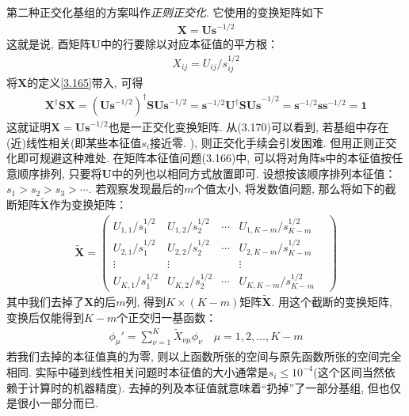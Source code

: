 第二种正交化基组的方案叫作\emph{正则正交化}. 
它使用的变换矩阵如下
\begin{align}
	\mathbf{X=Us}^{-1/2}
\end{align}
这就是说, 
酉矩阵$\mathbf{U}$中的行要除以对应本征值的平方根：
\begin{align}
	X_{ij} = U_{ij}/s_{ij}^{1/2}
\end{align}
将$\mathbf{X}$的定义\autoref{3.165}带入, 
可得
\begin{align}
	\mathbf{X^\dagger SX} = (\mathbf{Us}^{-1/2})^\dagger\mathbf{SUs}^{-1/2} = \mathbf{s}^{-1/2}\mathbf{U^\dagger SUs}^{-1/2} = \mathbf{s}^{-1/2}\mathbf{ss}^{-1/2}=\mathbf{1}
\end{align}
这就证明$\mathbf{X=Us}^{-1/2}$也是一正交化变换矩阵. 
从(3.170)可以看到, 
若基组中存在(近)线性相关(即某些本征值$s_i$接近零.
), 
则正交化手续会引发困难. 
但用正则正交化即可规避这种难处. 
在矩阵本征值问题(3.166)中, 
可以将对角阵$\mathbf{s}$中的本征值按任意顺序排列, 
只要将$\mathbf{U}$中的列也以相同方式放置即可. 
设想按该顺序排列本征值：$s_1>s_2>s_3>\cdots$. 
若观察发现最后的$m$个值太小, 
将发数值问题, 
那么将如下的截断矩阵$\mathbf{\tilde{X}}$作为变换矩阵：
\begin{align}
	\tilde{\mathbf{X}} =
	\begin{pmatrix}
		U_{1,1}/s^{1/2}_{1} & U_{1,2}/s^{1/2}_{2} & \cdots & U_{1,K-m}/s^{1/2}_{K-m} &  \\
		U_{2,1}/s^{1/2}_{1} & U_{2,2}/s^{1/2}_{2} & \cdots & U_{2,K-m}/s^{1/2}_{K-m} &  \\
		\vdots              & \vdots              &        & \vdots                  &  \\
		U_{K,1}/s^{1/2}_{1} & U_{K,2}/s^{1/2}_{2} & \cdots & U_{K,K-m}/s^{1/2}_{K-m} &
	\end{pmatrix}
\end{align}
其中我们去掉了$\mathbf{X}$的后$m$列, 
得到$K\times (K-m)$矩阵$\tilde{\mathbf{X}}$. 
用这个截断的变换矩阵, 
变换后仅能得到$K-m$个正交归一基函数：
\begin{align}
	\phi_\mu' = \sum_{\nu=1}^{K}\tilde{X}_{\nu\mu}\phi_\nu\quad\mu=1,2,\ldots,K-m
\end{align}
若我们去掉的本征值真的为零, 
则以上函数所张的空间与原先函数所张的空间完全相同. 
实际中碰到线性相关问题时本征值的大小通常是$s_i\leqslant 10^{-4}$(这个区间当然依赖于计算时的机器精度). 
去掉的列及本征值就意味着``扔掉''了一部分基组, 
但也仅是很小一部分而已.


